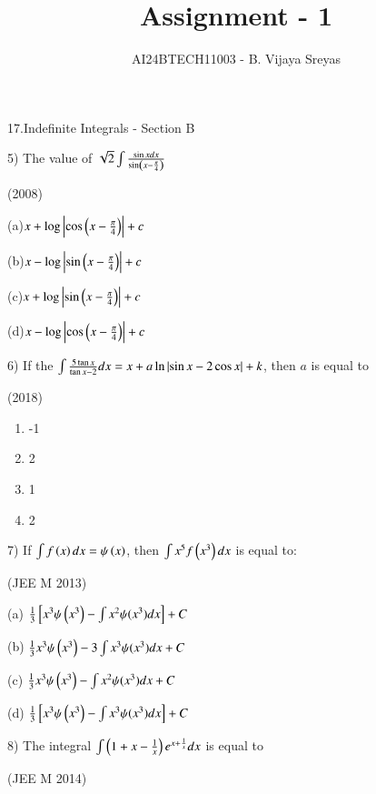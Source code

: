 \documentclass[journal,12pt,twocolumn]{IEEEtran}
\theoremstyle{remark}
\begin{document}

\vspace{3cm}

\title{Assignment - 1}
\author{AI24BTECH11003 - B. Vijaya Sreyas}
\maketitle
\newpage
\bigskip

\renewcommand{\thefigure}{\theenumi}
\renewcommand{\thetable}{\theenumi}

17.Indefinite Integrals - Section B

5)
	 The value of $\sqrt{2}\int\frac{\sin xdx}{\sin \left(x-\frac{\pi}{4}\right)}$

		\hfill{(2008)}

		(a)$x+\log\left\vert\cos \left(x-\frac{\pi}{4}\right)\right\vert+c$

		(b)$x-\log\left\vert\sin \left(x-\frac{\pi}{4}\right)\right\vert+c$

		(c)$x+\log\left\vert\sin \left(x-\frac{\pi}{4}\right)\right\vert+c$

		(d)$x-\log\left\vert\cos \left(x-\frac{\pi}{4}\right)\right\vert+c$

6)
	 If the $\int\frac{5\tan x}{\tan x-2}dx=x+a\ln \left\vert\sin x-2\cos x\right\vert+k$, then $a$ is equal to

		\hfill{(2018)}

		\begin{multicols}{4}
			\begin{enumerate}[label=(\alph*)]
				\item -1
				\item 2
				\item 1
				\item 2
			\end{enumerate}
		\end{multicols}
		
7)
	If $\int f\left(x\right)dx=\psi\left(x\right)$, then $\int x^5f\left(x^3\right)dx$ is equal to:

		\hfill{(JEE M 2013)}

		(a) $\frac{1}{3}{}\left[x^3\psi\left(x^3\right)-\int x^2\psi(x^3)dx\right] + C$

		(b) $\frac{1}{3}x^3\psi\left(x^3\right)-3\int x^3\psi(x^3)dx + C$

		(c) $\frac{1}{3}x^3\psi\left(x^3\right)-\int x^2\psi(x^3)dx + C$

		(d) $\frac{1}{3}{}\left[x^3\psi\left(x^3\right)-\int x^3\psi(x^3)dx\right] + C$

8)
	 The integral $\int\left(1+x-\frac{1}{x}\right)e^{x+\frac{1}{x}}dx$ is equal to

		\hfill{(JEE M 2014)}
\end{document}
